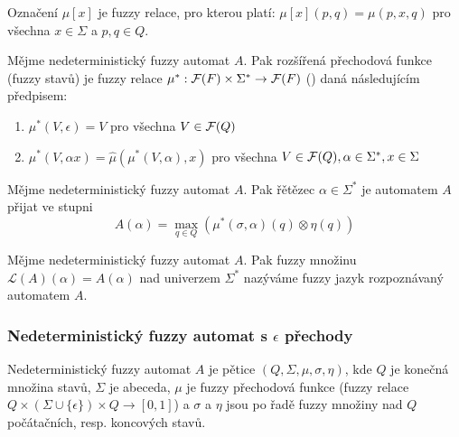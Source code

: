 \documentclass[a4paper,10pt]{article}
\begin{document}
\begin{note}
 Označení $\mu[x]$ je fuzzy relace, pro kterou platí: $\mu[x](p, q) = \mu(p, x, q)$ pro všechna $x \in \Sigma$ a $p, q \in Q$.
\end{note}

\begin{definition}\label{def-PreFunFuzzStav}
 Mějme nedeterministický fuzzy automat $A$. Pak rozšířená přechodová funkce (fuzzy stavů) je fuzzy relace $\mu^*: \mathcal{F}(F) \times \Sigma^* \rightarrow \mathcal{F}(F)$ () daná následujícím předpisem:
 \begin{enumerate}
  \item $\mu^*(V, \epsilon) = V$ pro všechna $V \in \mathcal{F}(Q)$
  \item $\mu^*(V, \alpha x) = \widehat{\mu}(\mu^*(V, \alpha), x)$ pro všechna $V \in \mathcal{F}(Q), \alpha \in \Sigma^*, x \in \Sigma$
 \end{enumerate}
\end{definition}

\begin{definition}\label{def-RetPriAut}
 Mějme nedeterministický fuzzy automat $A$. Pak řětězec $\alpha \in \Sigma^*$ je automatem $A$ přijat ve stupni
 $$
  A(\alpha) = \max_{q \in Q} (\mu^*(\sigma, \alpha)(q) \otimes \eta(q))
 $$
\end{definition}

\begin{definition}\label{def-JazRozpAut}
 Mějme nedeterministický fuzzy automat $A$. Pak fuzzy množinu $\mathcal{L}(A)(\alpha) = A(\alpha)$ nad univerzem $\Sigma^*$ nazýváme fuzzy jazyk rozpoznávaný automatem $A$.

\end{definition}

\subsubsection*{Nedeterministický fuzzy automat s $\epsilon$ přechody}

\begin{definition}\label{def-NedFuzzAutEpsPre}
 Nedeterministický fuzzy automat $A$ je pětice $(Q, \Sigma, \mu, \sigma, \eta)$, kde $Q$ je konečná množina stavů, $\Sigma$ je abeceda, $\mu$ je fuzzy přechodová funkce (fuzzy relace $Q \times (\Sigma \cup \{ \epsilon \}) \times Q \rightarrow [0, 1]$) a $\sigma$ a $\eta$ jsou po řadě fuzzy množiny nad $Q$ počátačních, resp. koncových stavů.
\end{definition}
\end{document}

